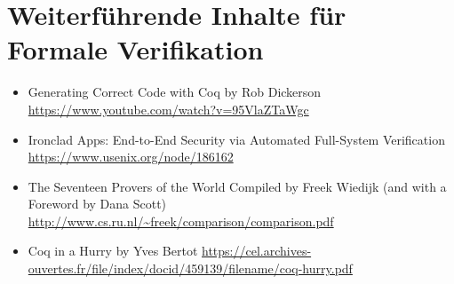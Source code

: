 \section{Weiterführende Inhalte für Formale Verifikation}
\label{a:somelabel}

\begin{itemize}
	\item Generating Correct Code with Coq by Rob Dickerson \url{https://www.youtube.com/watch?v=95VlaZTaWgc}
	\item Ironclad Apps: End-to-End Security via Automated Full-System Verification \url{https://www.usenix.org/node/186162}
	\item The Seventeen Provers of the World Compiled by Freek Wiedijk
	(and with a Foreword by Dana Scott)
 \url{http://www.cs.ru.nl/~freek/comparison/comparison.pdf}
	\item Coq in a Hurry by Yves Bertot \url{https://cel.archives-ouvertes.fr/file/index/docid/459139/filename/coq-hurry.pdf}
\end{itemize} 

